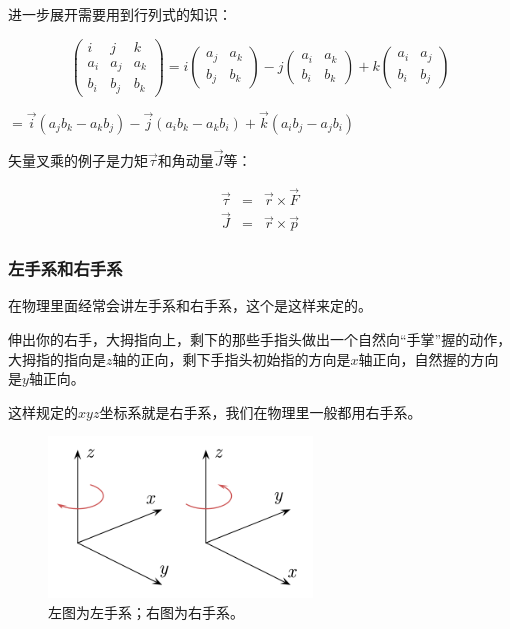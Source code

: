 进一步展开需要用到行列式的知识：

\begin{equation*}
\left(  
\begin{array} {lcr}
i & j & k \\
a_i & a_j & a_k \\
b_i & b_j & b_k 
\end{array}
\right)
= i 
\left(  
\begin{array} {lcr}
 a_j & a_k \\
 b_j & b_k 
\end{array}
\right)
- j
\left(  
\begin{array} {lcr}
 a_i & a_k \\
 b_i & b_k 
\end{array}
\right)
+ k
\left(  
\begin{array} {lcr}
 a_i & a_j \\
 b_i & b_j 
\end{array}
\right)
\end{equation*}

$= \vec i (a_j b_k - a_k b_j) - \vec j (a_i b_k - a_k b_i) + \vec k (a_i b_j - a_j b_i)$

矢量叉乘的例子是力矩$\vec \tau$和角动量$\vec J$等：

\begin{eqnarray}
\vec \tau &=& \vec r \times \vec F \\
\vec J & = & \vec r \times \vec p
\end{eqnarray}


\subsubsection{左手系和右手系}

在物理里面经常会讲左手系和右手系，这个是这样来定的。

伸出你的右手，大拇指向上，剩下的那些手指头做出一个自然向“手掌”握的动作，大拇指的指向是$z$轴的正向，剩下手指头初始指的方向是$x$轴正向，自然握的方向是$y$轴正向。

这样规定的$xyz$坐标系就是右手系，我们在物理里一般都用右手系。

\begin{figure}[htbp]
\begin{center}
\includegraphics[width=7cm]{Preface/lefthandrighthand.png}
\caption{左图为左手系；右图为右手系。}
\end{center}
\end{figure}

